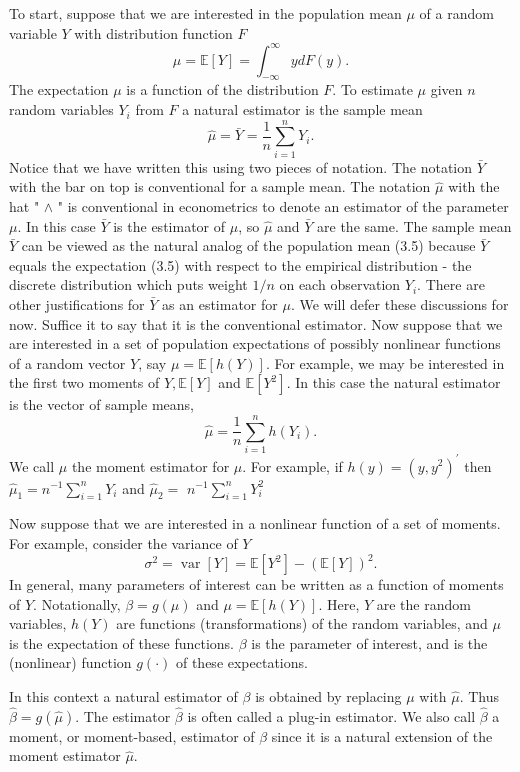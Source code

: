\documentclass[10pt]{article}
\begin{document}
To start, suppose that we are interested in the population mean $\mu$ of a random variable $Y$ with distribution function $F$
$$
\mu=\mathbb{E}[Y]=\int_{-\infty}^{\infty} y d F(y) .
$$
The expectation $\mu$ is a function of the distribution $F$. To estimate $\mu$ given $n$ random variables $Y_{i}$ from $F$ a natural estimator is the sample mean
$$
\widehat{\mu}=\bar{Y}=\frac{1}{n} \sum_{i=1}^{n} Y_{i} .
$$
Notice that we have written this using two pieces of notation. The notation $\bar{Y}$ with the bar on top is conventional for a sample mean. The notation $\widehat{\mu}$ with the hat " $\wedge$ " is conventional in econometrics to denote an estimator of the parameter $\mu$. In this case $\bar{Y}$ is the estimator of $\mu$, so $\widehat{\mu}$ and $\bar{Y}$ are the same. The sample mean $\bar{Y}$ can be viewed as the natural analog of the population mean (3.5) because $\bar{Y}$ equals the expectation (3.5) with respect to the empirical distribution - the discrete distribution which puts weight $1 / n$ on each observation $Y_{i}$. There are other justifications for $\bar{Y}$ as an estimator for $\mu$. We will defer these discussions for now. Suffice it to say that it is the conventional estimator. Now suppose that we are interested in a set of population expectations of possibly nonlinear functions of a random vector $Y$, say $\mu=\mathbb{E}[h(Y)]$. For example, we may be interested in the first two moments of $Y, \mathbb{E}[Y]$ and $\mathbb{E}\left[Y^{2}\right]$. In this case the natural estimator is the vector of sample means,
$$
\widehat{\mu}=\frac{1}{n} \sum_{i=1}^{n} h\left(Y_{i}\right) .
$$
We call $\widehat{\mu}$ the moment estimator for $\mu$. For example, if $h(y)=\left(y, y^{2}\right)^{\prime}$ then $\widehat{\mu}_{1}=n^{-1} \sum_{i=1}^{n} Y_{i}$ and $\widehat{\mu}_{2}=$ $n^{-1} \sum_{i=1}^{n} Y_{i}^{2}$

Now suppose that we are interested in a nonlinear function of a set of moments. For example, consider the variance of $Y$
$$
\sigma^{2}=\operatorname{var}[Y]=\mathbb{E}\left[Y^{2}\right]-(\mathbb{E}[Y])^{2} .
$$
In general, many parameters of interest can be written as a function of moments of $Y$. Notationally, $\beta=g(\mu)$ and $\mu=\mathbb{E}[h(Y)]$. Here, $Y$ are the random variables, $h(Y)$ are functions (transformations) of the random variables, and $\mu$ is the expectation of these functions. $\beta$ is the parameter of interest, and is the (nonlinear) function $g(\cdot)$ of these expectations.

In this context a natural estimator of $\beta$ is obtained by replacing $\mu$ with $\widehat{\mu}$. Thus $\widehat{\beta}=g(\widehat{\mu})$. The estimator $\widehat{\beta}$ is often called a plug-in estimator. We also call $\widehat{\beta}$ a moment, or moment-based, estimator of $\beta$ since it is a natural extension of the moment estimator $\widehat{\mu}$.
\end{document}
